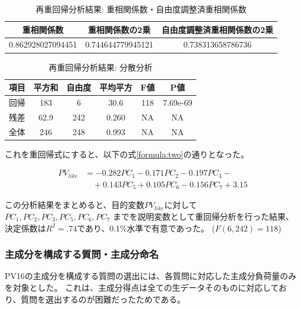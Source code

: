 \documentclass[11pt,a4paper, uplatex]{jsarticle}
\begin{document}
\begin{table}[htbp]
  \begin{center}
    \caption{再重回帰分析結果: 重相関係数・自由度調整済重相関係数}
    \begin{tabular}{c|c|c}
      \hline
      重相関係数 & 重相関係数の2乗 & 自由度調整済重相関係数の2乗 \\ \hline \hline
      0.862928027094451 & 0.744644779945121 & 0.738313658786736
    \end{tabular}
    \label{Rs-new}
  \end{center}
\end{table}

\begin{table}[htbp]
  \begin{center}
    \caption{再重回帰分析結果: 分散分析}
    \begin{tabular}{c|c|c|c|c|c}
      \hline
      項目 & 平方和 & 自由度 & 平均平方 & F値 & P値 \\ \hline \hline
      回帰 & 183 & 6 & 30.6 & 118 & 7.69e-69 \\
      残差 & 62.9 & 242 & 0.260 & NA & NA \\
      全体 & 246 & 248 & 0.993 & NA & NA \\
    \end{tabular}
    \label{annova-new}
  \end{center}
\end{table}

これを重回帰式にすると、以下の式\ref{formula:two}の通りとなった。

\begin{equation}
  \label{formula:two}
  \begin{split}
    PV_{like} &= -0.282PC_1 - 0.171PC_2 - 0.197PC_3 - \\
    &\quad + 0.143PC_5 + 0.105PC_6 - 0.156PC_7 + 3.15
  \end{split}
\end{equation}

この分析結果をまとめると、目的変数$ PV_{like} $に対して
$ PC_1, PC_2, PC_3, PC_5, PC_6, PC_7$
までを説明変数として重回帰分析を行った結果、
決定係数は$ R^2 = .74 $であり、0.1\%水準で有意であった。
($ F(6, 242) = 118 $)

\subsubsection{主成分を構成する質問・主成分命名}
PV16の主成分を構成する質問の選出には、各質問に対応した主成分負荷量のみを対象とした。
これは、主成分得点は全ての生データそのものに対応しており、質問を選出するのが困難だったためである。
\end{document}
